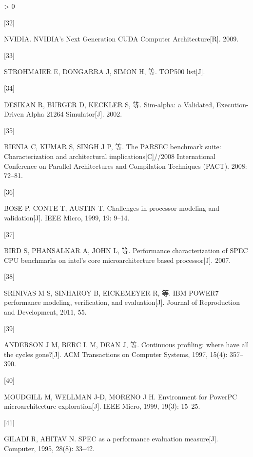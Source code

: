 \documentclass[]{ctexbook}
\newlength{\cslhangindent}
\newlength{\csllabelwidth}
\newenvironment{CSLReferences}[3] %
 {%
  \setlength{\parindent}{0pt}
  \ifodd #1 \everypar{\setlength{\hangindent}{\cslhangindent}}\ignorespaces\fi
  \ifnum #2 > 0
  \setlength{\parskip}{#3\baselineskip}
  \fi
 }%
 {}
\newcommand{\CSLLeftMargin}[1]{\parbox[t]{\maxof{\widthof{#1}}{\csllabelwidth}}{#1}}
\newcommand{\CSLRightInline}[1]{\parbox[t]{\linewidth}{#1}}
\begin{document}
\begin{CSLReferences}{0}{0}
\leavevmode\hypertarget{ref-nvidia_nvidias_2009}{}%
\CSLLeftMargin{{[}32{]} }
\CSLRightInline{NVIDIA. {NVIDIA}'s {Next} {Generation} {CUDA} {Computer} {Architecture}{[}R{]}. 2009.}

\leavevmode\hypertarget{ref-strohmaier_top500_nodate}{}%
\CSLLeftMargin{{[}33{]} }
\CSLRightInline{STROHMAIER E, DONGARRA J, SIMON H, 等. {TOP500} list{[}J{]}.}

\leavevmode\hypertarget{ref-desikan_sim-alpha_2002}{}%
\CSLLeftMargin{{[}34{]} }
\CSLRightInline{DESIKAN R, BURGER D, KECKLER S, 等. Sim-alpha: a {Validated}, {Execution}-{Driven} {Alpha} 21264 {Simulator}{[}J{]}. 2002.}

\leavevmode\hypertarget{ref-bienia_parsec_2008}{}%
\CSLLeftMargin{{[}35{]} }
\CSLRightInline{BIENIA C, KUMAR S, SINGH J P, 等. The {PARSEC} benchmark suite: {Characterization} and architectural implications{[}C{]}//2008 {International} {Conference} on {Parallel} {Architectures} and {Compilation} {Techniques} ({PACT}). 2008: 72--81.}

\leavevmode\hypertarget{ref-bose_challenges_1999}{}%
\CSLLeftMargin{{[}36{]} }
\CSLRightInline{BOSE P, CONTE T, AUSTIN T. Challenges in processor modeling and validation{[}J{]}. IEEE Micro, 1999, 19: 9--14.}

\leavevmode\hypertarget{ref-bird_performance_2007}{}%
\CSLLeftMargin{{[}37{]} }
\CSLRightInline{BIRD S, PHANSALKAR A, JOHN L, 等. Performance characterization of {SPEC} {CPU} benchmarks on intel's core microarchitecture based processor{[}J{]}. 2007.}

\leavevmode\hypertarget{ref-srinivas_ibm_2011}{}%
\CSLLeftMargin{{[}38{]} }
\CSLRightInline{SRINIVAS M S, SINHAROY B, EICKEMEYER R, 等. {IBM} {POWER7} performance modeling, verification, and evaluation{[}J{]}. Journal of Reproduction and Development, 2011, 55.}

\leavevmode\hypertarget{ref-anderson_continuous_1997}{}%
\CSLLeftMargin{{[}39{]} }
\CSLRightInline{ANDERSON J M, BERC L M, DEAN J, 等. Continuous profiling: where have all the cycles gone?{[}J{]}. ACM Transactions on Computer Systems, 1997, 15(4): 357--390.}

\leavevmode\hypertarget{ref-moudgill_environment_1999}{}%
\CSLLeftMargin{{[}40{]} }
\CSLRightInline{MOUDGILL M, WELLMAN J-D, MORENO J H. Environment for {PowerPC} microarchitecture exploration{[}J{]}. IEEE Micro, 1999, 19(3): 15--25.}

\leavevmode\hypertarget{ref-giladi_spec_1995}{}%
\CSLLeftMargin{{[}41{]} }
\CSLRightInline{GILADI R, AHITAV N. {SPEC} as a performance evaluation measure{[}J{]}. Computer, 1995, 28(8): 33--42.}


\end{CSLReferences}
\end{document}

